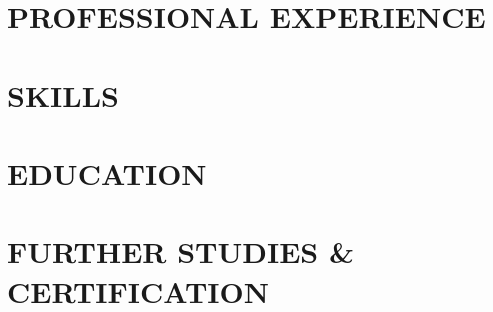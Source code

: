 \documentclass[12pt, letterpaper]{report}
\begin{document}
\onlineHeader
\vspace{-.8cm}
\section{\faBriefcase \space PROFESSIONAL EXPERIENCE}
\resumeSubHeadingList
\treon
\tampere
\nokia
\resumeSubHeadingListEnd
\vspace{-.8cm}
\newlength{\rowSpace}
\setlength{\rowSpace}{1.8mm}
\section{\faPuzzlePiece\space SKILLS}
\generalSkills
\vspace{-.6cm}
\section{\faGraduationCap\space EDUCATION}
\resumeSubHeadingList
\eduTampere
\eduNodet
\resumeSubHeadingListEnd
\section{\faBook\space FURTHER STUDIES \& CERTIFICATION}
\certGeneral
\end{document}
